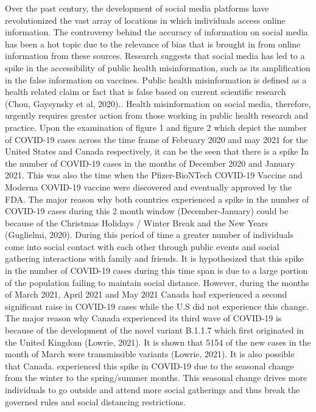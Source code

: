 \documentclass[10pt,twocolumn,letterpaper]{article}
\begin{document}
 
Over the past century, the development of social media platforms have revolutionized the vast array of locations in which individuals access online information. The controversy behind the accuracy of information on social media has been a hot topic due to the relevance of bias that is brought in from online information from these sources. Research suggests that social media has led to a spike in the accessibility of public health misinformation, such as its amplification in the false information on vaccines. Public health misinformation is defined as a health related claim or fact that is false based on current scientific research (Chou, Gaysynsky et al, 2020).. Health misinformation on social media, therefore, urgently requires greater action from those working in public health research and practice. 
Upon the examination of figure 1 and figure 2 which depict the number of COVID-19 cases across the time frame of February 2020 and may 2021 for the United States and Canada respectively, it can be the seen that there is a spike In the number of COVID-19 cases in the months of December 2020 and January 2021. This was also the time when the Pfizer-BioNTech COVID-19 Vaccine and Moderna COVID-19 vaccine were discovered and eventually approved by the FDA. The major reason why both countries experienced a spike in the number of COVID-19 cases during this 2 month window (December-January) could be because of the Christmas Holidays / Winter Break and the New Years (Guglielmi, 2020). During this period of time a greater number of individuals come into social contact with each other through public events and social gathering interactions with family and friends. It is hypothesized that this spike in the number of COVID-19 cases during this time span is due to a large portion of the population failing to maintain social distance. However, during the months of March 2021, April 2021 and May 2021 Canada had experienced a second significant raise in COVID-19 cases while the U.S did not experience this change. The major reason why Canada experienced its third wave of COVID-19 is because of the development of the novel variant B.1.1.7 which first originated in the United Kingdom (Lowrie, 2021). It is shown that 5154 of the new cases in the month of March were transmissible variants (Lowrie, 2021). It is also possible that Canada. experienced this spike in COVID-19 due to the seasonal change from the winter to the spring/summer months. This seasonal change drives more individuals to go outside and attend more social gatherings and thus break the governed rules and social distancing restrictions.
\end{document}
